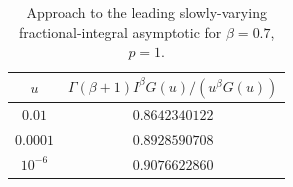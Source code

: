 \begin{table}[htbp]
\centering\small
\caption{Approach to the leading slowly-varying fractional-integral asymptotic for $\beta=0.7$, $p=1$.}
\label{tab:endpoint-ratio}
\begin{tabular}{@{}cc@{}}
\toprule
$u$ & $\Gamma(\beta+1)I^\beta G(u)/(u^\beta G(u))$\\
\midrule
$0.01$ & $0.8642340122$\\
$0.0001$ & $0.8928590708$\\
$10^{-6}$ & $0.9076622860$\\
\bottomrule
\end{tabular}
\end{table}
